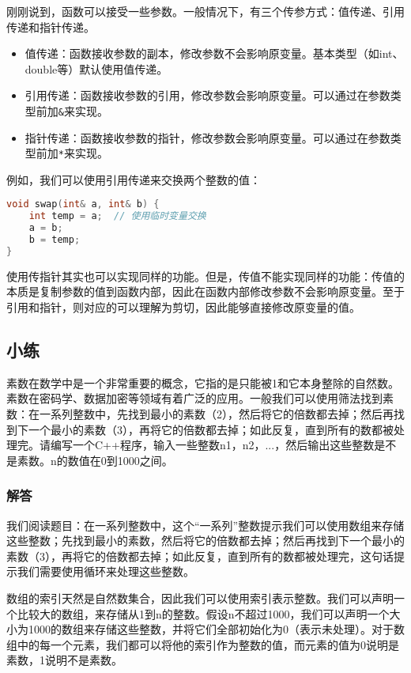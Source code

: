 \documentclass[../main.tex]{subfiles}
\begin{document}
刚刚说到，函数可以接受一些参数。一般情况下，有三个传参方式：值传递、引用传递和指针传递。
\begin{itemize}
  \item 值传递：函数接收参数的副本，修改参数不会影响原变量。基本类型（如int、double等）默认使用值传递。
  \item 引用传递：函数接收参数的引用，修改参数会影响原变量。可以通过在参数类型前加\texttt{\&}来实现。
  \item 指针传递：函数接收参数的指针，修改参数会影响原变量。可以通过在参数类型前加\texttt{*}来实现。
\end{itemize}
例如，我们可以使用引用传递来交换两个整数的值：
\begin{lstlisting}[language=C++]
void swap(int& a, int& b) {
    int temp = a;  // 使用临时变量交换
    a = b;
    b = temp;
}
\end{lstlisting}
使用传指针其实也可以实现同样的功能。但是，传值不能实现同样的功能：传值的本质是复制参数的值到函数内部，因此在函数内部修改参数不会影响原变量。至于引用和指针，则对应的可以理解为剪切，因此能够直接修改原变量的值。

\subsection{小练}

素数在数学中是一个非常重要的概念，它指的是只能被1和它本身整除的自然数。素数在密码学、数据加密等领域有着广泛的应用。一般我们可以使用筛法找到素数：在一系列整数中，先找到最小的素数（2），然后将它的倍数都去掉；然后再找到下一个最小的素数（3），再将它的倍数都去掉；如此反复，直到所有的数都被处理完。请编写一个C++程序，输入一些整数n1，n2，...，然后输出这些整数是不是素数。n的数值在0到1000之间。

\subsubsection{解答}

我们阅读题目：在一系列整数中，这个“一系列”整数提示我们可以使用数组来存储这些整数；先找到最小的素数，然后将它的倍数都去掉；然后再找到下一个最小的素数（3），再将它的倍数都去掉；如此反复，直到所有的数都被处理完，这句话提示我们需要使用循环来处理这些整数。

数组的索引天然是自然数集合，因此我们可以使用索引表示整数。我们可以声明一个比较大的数组，来存储从1到n的整数。假设n不超过1000，我们可以声明一个大小为1000的数组来存储这些整数，并将它们全部初始化为0（表示未处理）。对于数组中的每一个元素，我们都可以将他的索引作为整数的值，而元素的值为0说明是素数，1说明不是素数。
\end{document}
